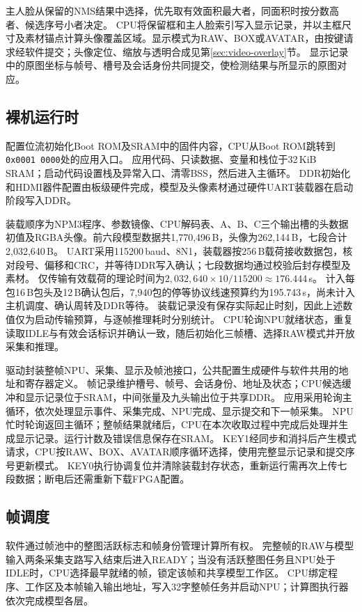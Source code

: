 主人脸从保留的NMS结果中选择，优先取有效面积最大者，同面积时按分数高者、候选序号小者决定。
CPU将保留框和主人脸索引写入显示记录，并以主框尺寸及素材锚点计算头像覆盖区域。显示模式为RAW、BOX或AVATAR，由按键请求经软件提交；头像定位、缩放与透明合成见第\ref{sec:video-overlay}节。
显示记录中的原图坐标与帧号、槽号及会话身份共同提交，使检测结果与所显示的原图对应。

\subsection{裸机运行时}

配置位流初始化Boot ROM及SRAM中的固件内容，CPU从Boot ROM跳转到\texttt{0x0001\,0000}处的应用入口。
应用代码、只读数据、变量和栈位于32\,KiB SRAM；启动代码设置栈及异常入口、清零BSS，然后进入主循环。
DDR初始化和HDMI器件配置由板级硬件完成，模型及头像素材通过硬件UART装载器在启动阶段写入DDR。

装载顺序为NPM3程序、参数镜像、CPU解码表、A、B、C三个输出槽的头数据初值及RGBA头像。前六段模型数据共1,770,496\,B，头像为262,144\,B，七段合计2,032,640\,B。
UART采用115200\,baud、8N1，装载器按256\,B载荷接收数据包，核对段号、偏移和CRC，并等待DDR写入确认；七段数据均通过校验后封存模型及素材。
仅传输有效载荷的理论时间为$2,032,640\times10/115200\approx176.444$\,s。
计入每包16\,B包头及12\,B确认包后，7,940包的停等协议线速预算约为195.743\,s，尚未计入主机调度、确认周转及DDR等待。
装载记录没有保存实际起止时刻，因此上述数值仅为启动传输预算，与逐帧推理耗时分别统计。
CPU轮询NPU就绪状态，重复读取IDLE与有效会话标识并确认一致，随后初始化三帧槽、选择RAW模式并开放采集和推理。

驱动封装整帧NPU、采集、显示及帧池接口，公共配置生成硬件与软件共用的地址和寄存器定义。
帧记录维护槽号、帧号、会话身份、地址及状态；CPU候选缓冲和显示记录位于SRAM，中间张量及九头输出位于共享DDR。
应用采用轮询主循环，依次处理显示事件、采集完成、NPU完成、显示提交和下一帧采集。
NPU忙时轮询返回主循环；整帧结果就绪后，CPU在本次收取过程中完成后处理并生成显示记录。运行计数及错误信息保存在SRAM。
KEY1经同步和消抖后产生模式请求，CPU按RAW、BOX、AVATAR顺序循环选择，使用完整显示记录和提交序号更新模式。
KEY0执行协调复位并清除装载封存状态，重新运行需再次上传七段数据；断电后还需重新下载FPGA配置。

\subsection{帧调度}

软件通过帧池中的整图活跃标志和帧身份管理计算所有权。
完整帧的RAW与模型输入两条采集支路写入结束后进入READY；当没有活跃整图任务且NPU处于IDLE时，CPU选择最早就绪的帧，锁定该帧和共享模型工作区。
CPU绑定程序、工作区及本帧输入输出地址，写入32字整帧任务并启动NPU；计算图执行器依次完成模型各层。

